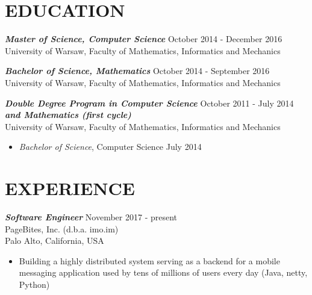 \documentclass[margin, 10pt]{res} %
\begin{document}
\begin{resume}


\section{EDUCATION}

{\sl \bf Master of Science, Computer Science } \hfill October 2014 - December 2016 \\
University of Warsaw, Faculty of Mathematics, Informatics and Mechanics

{\sl \bf Bachelor of Science, Mathematics } \hfill October 2014 - September 2016\\
University of Warsaw, Faculty of Mathematics, Informatics and Mechanics

{\sl \bf Double Degree Program in Computer Science} \hfill October 2011 - July 2014 \\ {\sl \bf and Mathematics (first cycle)} \\
University of Warsaw, Faculty of Mathematics, Informatics and Mechanics
\begin{itemize}
\item {\sl Bachelor of Science}, Computer Science \hfill July 2014
\end{itemize}
 
\section{EXPERIENCE}

{\sl \bf Software Engineer} \hfill November 2017 - present \\
PageBites, Inc. (d.b.a. imo.im) \\
Palo Alto, California, USA

\begin{itemize} \itemsep -2pt %
\item Building a highly distributed system serving as a backend for a mobile messaging application used by tens of millions of users every day (Java, netty, Python)
\end{itemize}


\end{resume}
\end{document}
